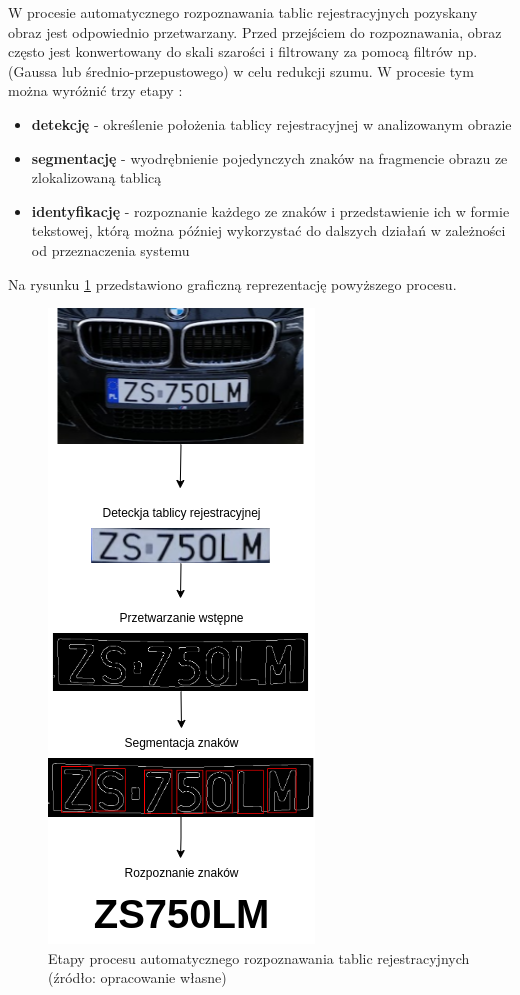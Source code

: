 W procesie automatycznego rozpoznawania tablic rejestracyjnych pozyskany obraz jest odpowiednio przetwarzany.
Przed przejściem do rozpoznawania, obraz często jest konwertowany do skali szarości i filtrowany za pomocą filtrów np.
(Gaussa lub średnio-przepustowego) w celu redukcji szumu.
W procesie tym można wyróżnić trzy etapy \cite{1688109}:
\begin{itemize}
    \item \textbf{detekcję} - określenie położenia tablicy rejestracyjnej w analizowanym obrazie
    \item \textbf{segmentację} - wyodrębnienie pojedynczych znaków na fragmencie obrazu ze zlokalizowaną tablicą
    \item \textbf{identyfikację} - rozpoznanie każdego ze znaków i przedstawienie ich w formie tekstowej, którą można później wykorzystać do dalszych działań w zależności od przeznaczenia systemu
\end{itemize}
\FloatBarrier
Na rysunku \ref{fig:schemat_lpr} przedstawiono graficzną reprezentację powyższego procesu.
\begin{figure}[!ht]
    \centering
    \includegraphics[scale=0.6]{Pictures/schemat_lpr.png}
    \caption{Etapy procesu automatycznego rozpoznawania tablic rejestracyjnych (źródło: opracowanie własne)}
    \label{fig:schemat_lpr}
\end{figure}
